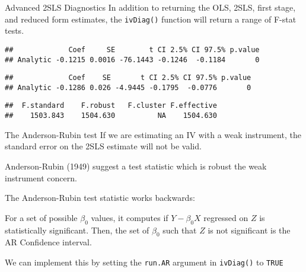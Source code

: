 \documentclass[
  ignorenonframetext,
]{beamer}
\newenvironment{Shaded}{\begin{snugshade}}{\end{snugshade}}
\newcommand{\NormalTok}[1]{#1}
\newcommand{\SpecialCharTok}[1]{\textcolor[rgb]{0.81,0.36,0.00}{\textbf{#1}}}
\begin{document}
\begin{frame}[fragile]{Advanced 2SLS Diagnostics}
\label{advanced-2sls-diagnostics-2}
In addition to returning the OLS, 2SLS, first stage, and reduced form
estimates, the \texttt{ivDiag()} function will return a range of F-stat
tests.

\scriptsize

\begin{Shaded}
\end{Shaded}

\begin{verbatim}
##             Coef     SE        t CI 2.5% CI 97.5% p.value
## Analytic -0.1215 0.0016 -76.1443 -0.1246  -0.1184       0
\end{verbatim}

\begin{Shaded}
\end{Shaded}

\begin{verbatim}
##             Coef    SE       t CI 2.5% CI 97.5% p.value
## Analytic -0.1286 0.026 -4.9445 -0.1795  -0.0776       0
\end{verbatim}

\begin{Shaded}
\end{Shaded}

\begin{verbatim}
##  F.standard    F.robust   F.cluster F.effective 
##    1503.843    1504.630          NA    1504.630
\end{verbatim}
\end{frame}

\begin{frame}[fragile]{The Anderson-Rubin test}
\label{the-anderson-rubin-test}
If we are estimating an IV with a weak instrument, the standard error on
the 2SLS estimate will not be valid.

Anderson-Rubin (1949) suggest a test statistic which is robust the weak
instrument concern.

The Anderson-Rubin test statistic works backwards:

For a set of possible \(\beta_{0}\) values, it computes if
\(Y - \beta_{0}X\) regressed on \(Z\) is statistically significant.
Then, the set of \(\beta_{0}\) such that \(Z\) is not significant is the
AR Confidence interval.

We can implement this by setting the \texttt{run.AR} argument in
\texttt{ivDiag()} to \texttt{TRUE}
\end{frame}
\end{document}
